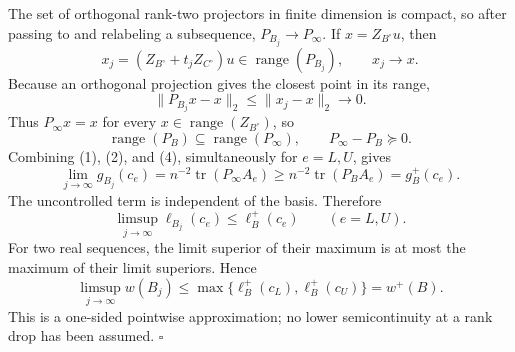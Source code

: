 The set of orthogonal rank-two projectors in finite dimension is compact, so after passing to and relabeling a subsequence, \(P_{B_j}\to P_{\infty}\).  If \(x=Z_{B^{\circ}}u\), then
\[
x_j=(Z_{B^{\circ}}+t_jZ_{C^{\circ}})u
\in\operatorname{range}(P_{B_j}),
\qquad x_j\longrightarrow x.
\]
Because an orthogonal projection gives the closest point in its range,
\[
\lVert P_{B_j}x-x\rVert_2
\le \lVert x_j-x\rVert_2\longrightarrow0.
\]
Thus \(P_{\infty}x=x\) for every \(x\in\operatorname{range}(Z_{B^{\circ}})\), so
\[
\operatorname{range}(P_B)\subseteq\operatorname{range}(P_{\infty}),
\qquad P_{\infty}-P_B\succeq0.                                   \tag{4}
\]
Combining (1), (2), and (4), simultaneously for \(e=L,U\), gives
\[
\lim_{j\to\infty}g_{B_j}(c_e)
=n^{-2}\operatorname{tr}(P_{\infty}A_e)
\ge n^{-2}\operatorname{tr}(P_BA_e)
=g_B^+(c_e).                                                       \tag{5}
\]
The uncontrolled term is independent of the basis.  Therefore
\[
\limsup_{j\to\infty}\ell_{B_j}(c_e)\le\ell_B^+(c_e)
\qquad(e=L,U).
\]
For two real sequences, the limit superior of their maximum is at most the maximum of their limit superiors.  Hence
\[
\limsup_{j\to\infty}w(B_j)
\le\max\{\ell_B^+(c_L),\ell_B^+(c_U)\}=w^+(B).
\]
This is a one-sided pointwise approximation; no lower semicontinuity at a rank drop has been assumed. \(\square\)